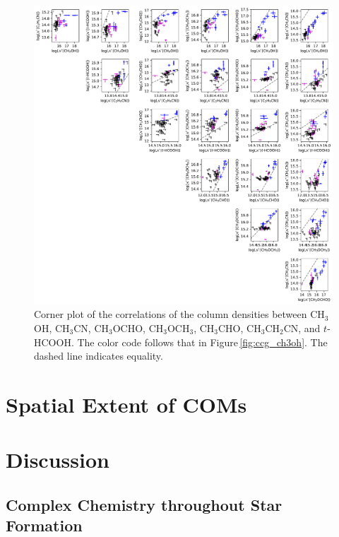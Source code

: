 \documentclass[twocolumn]{aastex62}
\newcommand{\kms}{\mbox{\,km\,s$^{-1}$}}
\newcommand{\jj}[2]{\mbox{$J = #1\rightarrow#2$}}
\newcommand{\methylformate}{\mbox{CH$_{3}$OCHO}}
\newcommand{\methanol}{\mbox{CH$_{3}$OH}}
\newcommand{\dimethylether}{\mbox{CH$_{3}$OCH$_{3}$}}
\newcommand{\acetaldehyde}{\mbox{CH$_{3}$CHO}}
\newcommand{\ethylcyanide}{\mbox{CH$_{3}$CH$_{2}$CN}}
\newcommand{\methylcyanide}{\mbox{CH$_{3}$CN}}
\newcommand{\sosigma}{\mbox{SO\,$^{3}\Sigma$}}
\begin{document}
\begin{figure}[htbp!]
  \centering
  \includegraphics[width=\textwidth]{corner_Ncol.pdf}
  \caption{Corner plot of the correlations of the column densities between \methanol, \methylcyanide, \methylformate, \dimethylether, \acetaldehyde, \ethylcyanide, and $t$-HCOOH.  The color code follows that in Figure\,\ref{fig:ccg_ch3oh}.  The dashed line indicates equality.}
  \label{fig:corner}
\end{figure}

\section{Spatial Extent of COMs}
\section{Discussion}
\subsection{Complex Chemistry throughout Star Formation}

\end{document}
